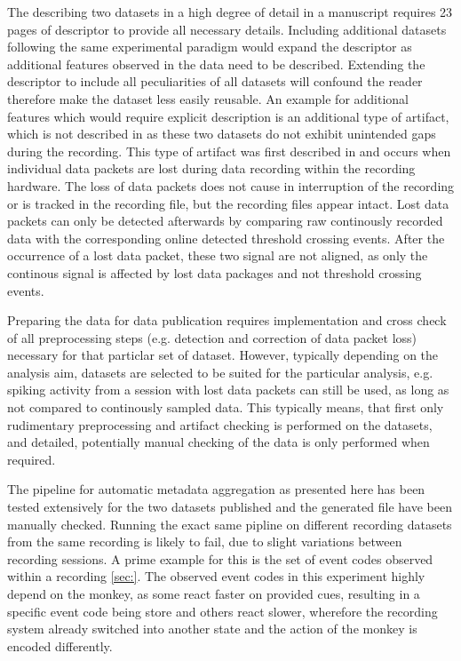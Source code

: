 The describing two datasets in a high degree of detail in a manuscript requires 23 pages of descriptor to provide all necessary details. Including additional datasets following the same experimental paradigm would expand the descriptor as additional features observed in the data need to be described. Extending the descriptor to include all peculiarities of all datasets will confound the reader therefore make the dataset less easily reusable.
An example for additional features which would require explicit description is an additional type of artifact, which is not described in \citet{Brochier_2018} as these two datasets do not exhibit unintended gaps during the recording. This type of artifact was first described in \citet{Sprenger_2014} and occurs when individual data packets are lost during data recording within the recording hardware. The loss of data packets does not cause in interruption of the recording or is tracked in the recording file, but the recording files appear intact. Lost data packets can only be detected afterwards by comparing raw continously recorded data with the corresponding online detected threshold crossing events. After the occurrence of a lost data packet, these two signal are not aligned, as only the continous signal is affected by lost data packages and not threshold crossing events.

Preparing the data for data publication requires implementation and cross check of all preprocessing steps (e.g. detection and correction of data packet loss) necessary for that particlar set of dataset. However, typically depending on the analysis aim, datasets are selected to be suited for the particular analysis, e.g. spiking activity from a session with lost data packets can still be used, as long as not compared to continously sampled data.  This typically means, that first only rudimentary preprocessing and artifact checking is performed on the datasets, and detailed, potentially manual checking of the data is only performed when required. 

The pipeline for automatic metadata aggregation as presented here has been tested extensively for the two datasets published and the generated file have been manually checked. Running the exact same pipline on different recording datasets from the same recording is likely to fail, due to slight variations between recording sessions. A prime example for this is the set of event codes observed within a recording \ref{sec:}. The observed event codes in this experiment highly depend on the monkey, as some react faster on provided cues, resulting in a specific event code being store and others react slower, wherefore the recording system already switched into another state and the action of the monkey is encoded differently.


